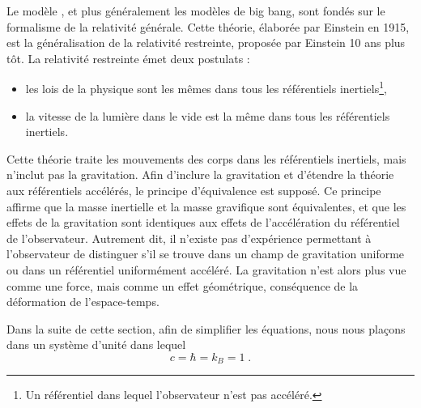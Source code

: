 \documentclass[11pt, twoside, a4paper, openright]{report}
\begin{document}
Le modèle \lcdm{}, et plus généralement les modèles de big bang, sont fondés sur le formalisme de la relativité générale.
Cette théorie, élaborée par Einstein en 1915, est la généralisation de la relativité restreinte, proposée par Einstein 10 ans plus tôt. La relativité restreinte émet deux postulats :
  \begin{itemize}[label=$\bullet$]
  \item les lois de la physique sont les mêmes dans tous les référentiels inertiels\footnote{Un référentiel dans lequel l'observateur n'est pas accéléré.},
  \item la vitesse de la lumière dans le vide est la même dans tous les référentiels inertiels.
  \end{itemize}
Cette théorie traite les mouvements des corps dans les référentiels inertiels, mais n'inclut pas la gravitation. Afin d'inclure la gravitation et d'étendre la théorie aux référentiels accélérés, le principe d'équivalence est supposé.
Ce principe affirme que la masse inertielle et la masse gravifique sont équivalentes, et que les effets de la gravitation sont identiques aux effets de l'accélération du référentiel de l'observateur. Autrement dit, il n'existe pas d'expérience permettant à l'observateur de distinguer s'il se trouve dans un champ de gravitation uniforme ou dans un référentiel uniformément accéléré. La gravitation n'est alors plus vue comme une force, mais comme un effet géométrique, conséquence de la déformation de l'espace-temps.

Dans la suite de cette section, afin de simplifier les équations, nous nous plaçons dans un système d'unité dans lequel
  \begin{equation}
    c = \hbar = k_{B} = 1  \; .
  \end{equation}
\end{document}
